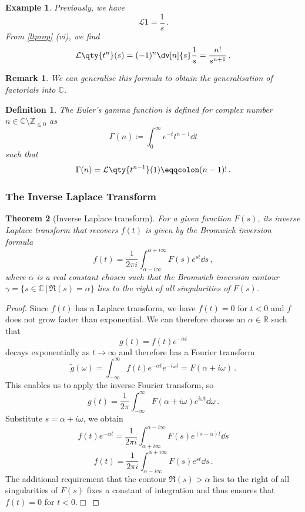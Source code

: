\documentclass{article}
\theoremstyle{plain}\theoremheaderfont{\normalfont\itshape}\theorembodyfont{\rmfamily}\theoremseparator{.}\newtheorem*{rem}{Remark}\newtheorem*{ex}{Example}\newtheorem*{proof}{Proof}\newtheorem*{altp}{Alternative proof}
\theoremstyle{plain}\theoremheaderfont{\normalfont\bfseries}\theorembodyfont{\rmfamily}\theoremseparator{.}\newtheorem{thm}{Theorem}[section]\newtheorem{lem}[thm]{Lemma}\newtheorem{prop}[thm]{Proposition}\newtheorem*{cor}{Corollary}\newtheorem{defn}[thm]{Definition}\newtheorem{clm}[thm]{Claim}\newtheorem{clminproof}{Claim}
\theoremstyle{break}\theoremheaderfont{\normalfont\itshape}\theorembodyfont{\rmfamily}\theoremseparator{.\medskip}\newtheorem*{proofskip}{Proof}\newtheorem*{exs}{Examples}\newtheorem*{rems}{Remarks}
\theoremstyle{break}\theoremheaderfont{\normalfont\bfseries}\theorembodyfont{\rmfamily}\theoremseparator{.\medskip}\newtheorem{lemskip}[thm]{Lemma}\newtheorem{defnskip}[thm]{Definition}\newtheorem{propskip}[thm]{Proposition}\newtheorem{thmskip}[thm]{Theorem}
\numberwithin{equation}{section}
\newcommand{\qed}{\hfill\ensuremath{\Box}}
\newcommand{\lt}[1]{\mathcal{L}\qty{ #1 }}
\begin{document}
	\begin{ex}
		Previously, we have
		\[\lt{1}=\frac{1}{s}\,.\]
		From \cref{ltprop} (vi), we find
		\[\lt{t^n}(s)=(-1)^n\dv[n]{s}\frac{1}{s}=\frac{n!}{s^{n+1}}\,.\]
	\end{ex}
	\begin{rem}
		We can generalise this formula to obtain the generalisation of factorials into \(\mathbb{C}\).
	\end{rem}
	\begin{defn}
		The \textit{Euler's gamma function} is defined for complex number \(n\in\mathbb{C}\setminus\mathbb{Z}_{\le 0}\) as
		\[\Gamma(n)\coloneqq \int_{0}^{\infty}e^{-t}t^{n-1}\dd{t}\]
		such that
		\[\Gamma(n)=\lt{t^{n-1}}(1)\eqqcolon(n-1)!\,.\]
	\end{defn}
	\subsubsection{The Inverse Laplace Transform}
	\begin{thm}[Inverse Laplace transform]
		For a given function \(F(s)\), its inverse Laplace transform that recovers \(f(t)\) is given by the \textit{Bromwich inversion formula}
		\[f(t)=\frac{1}{2\pi i}\int_{\alpha-i\infty}^{\alpha+i\infty}F(s)e^{st}\dd{s}\,,\]
		where \(\alpha\) is a real constant chosen such that the \textit{Bromwich inversion contour} \(\gamma=\{s\in\mathbb{C}\,|\,\Re(s)=\alpha\}\) lies to the right of all singularities of \(F(s)\).
	\end{thm}
	\begin{proof}
		Since \(f(t)\) has a Laplace transform, we have \(f(t)=0\) for \(t<0\) and \(f\) does not grow faster than exponential. We can therefore choose an \(\alpha\in\mathbb{R}\) such that
		\[g(t)=f(t)e^{-\alpha t}\]
		decays exponentially as \(t\to\infty\) and therefore has a Fourier transform
		\[\tilde{g}(\omega)=\int_{-\infty}^{\infty}f(t)e^{-\alpha t}e^{-i\omega t}=F(\alpha+i\omega)\,.\]
		This enables us to apply the inverse Fourier transform, so
		\[g(t)=\frac{1}{2\pi}\int_{-\infty}^{\infty}F(\alpha+i\omega)e^{i\omega t}\dd{\omega}\,.\]
		Substitute \(s=\alpha+i\omega\), we obtain
		\[f(t)e^{-\alpha t}=\frac{1}{2\pi i}\int_{\alpha+i\infty}^{\alpha-i\infty}F(s)e^{(s-\alpha)t}\dd{s}\]
		\[f(t)=\frac{1}{2\pi i}\int_{\alpha-i\infty}^{\alpha+i\infty}F(s)e^{st}\dd{s}\,.\]
		The additional requirement that the contour \(\Re(s)>\alpha\) lies to the right of all singularities of \(F(s)\) fixes a constant of integration and thus ensures that \(f(t)=0\) for \(t<0\).\qed
	\end{proof}
\end{document}

